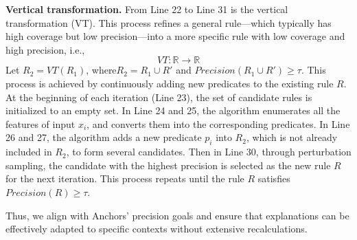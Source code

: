 \textbf{Vertical transformation.} From Line 22 to Line 31 is the vertical transformation (VT). This process refines a general rule—which typically has high coverage but low precision—into a more specific rule with low coverage and high precision, i.e.,  
$$VT: \mathbb{R} \rightarrow \mathbb{R}$$
Let $R_2=VT(R_1)$, where$R_2 =R_1 \cup R'$ and $Precision(R_1 \cup R') \geq \tau$.
This process is achieved by continuously adding new predicates to the existing rule \(R\). At the beginning of each iteration (Line 23), the set of candidate rules is initialized to an empty set. In Line 24 and 25, the algorithm enumerates all the features of input \(x_i\), and converts them into the corresponding predicates. In Line 26 and 27, the algorithm adds a new predicate \(p_{i}\) into \(R_2\), which is not already included in \(R_2\), to form several candidates. Then in Line 30, through perturbation sampling, the candidate with the highest precision is selected as the new rule \(R\) for the next iteration. This process repeats until the rule \(R\) satisfies \(Precision(R) \geq \tau\).  

Thus, we align with Anchors' precision goals and ensure that explanations can be effectively adapted to specific contexts without extensive recalculations.








